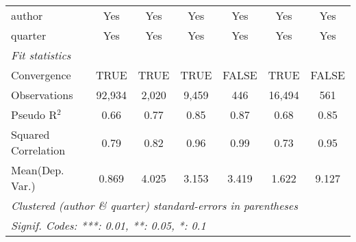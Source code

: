 \begin{tabular}{lcccccc}
   author                                                     & Yes           & Yes           & Yes           & Yes           & Yes            & Yes\\  
   quarter                                                    & Yes           & Yes           & Yes           & Yes           & Yes            & Yes\\  
   \midrule
   \emph{Fit statistics}\\
   Convergence                                                &TRUE           & TRUE          & TRUE          & FALSE         & TRUE           & FALSE\\  
   Observations                                               & 92,934        & 2,020         & 9,459         & 446           & 16,494         & 561\\  
   Pseudo R$^2$                                               & 0.66          & 0.77          & 0.85          & 0.87          & 0.68           & 0.85\\  
   Squared Correlation                                        & 0.79          & 0.82          & 0.96          & 0.99          & 0.73           & 0.95\\  
Mean(Dep. Var.) & 0.869 & 4.025 & 3.153 & 3.419 & 1.622 & 9.127 \\
   \midrule \midrule
   \multicolumn{7}{l}{\emph{Clustered (author \& quarter) standard-errors in parentheses}}\\
   \multicolumn{7}{l}{\emph{Signif. Codes: ***: 0.01, **: 0.05, *: 0.1}}\\
\end{tabular}
\par\endgroup

